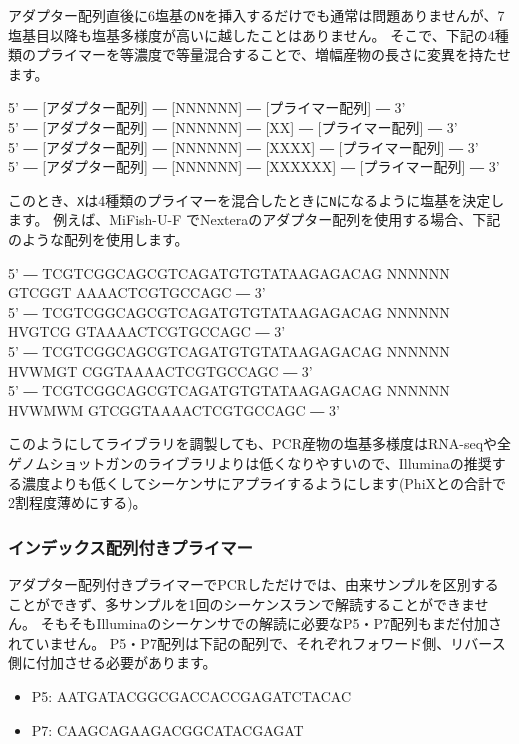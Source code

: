 \documentclass[titlepage,10pt,a4paper]{jsbook}
\newenvironment{pre}{\begin{leftbar}\raggedright\ttfamily\footnotesize\setlength{\baselineskip}{1.4em}}{\end{leftbar}\vspace{-1em}}
\begin{document}
アダプター配列直後に6塩基の\texttt{N}を挿入するだけでも通常は問題ありませんが、7塩基目以降も塩基多様度が高いに越したことはありません。
そこで、下記の4種類のプライマーを等濃度で等量混合することで、増幅産物の長さに変異を持たせます。

\begin{pre}
5' ― [アダプター配列] ― [NNNNNN] ― [プライマー配列] ― 3'\\
5' ― [アダプター配列] ― [NNNNNN] ― [XX] ― [プライマー配列] ― 3'\\
5' ― [アダプター配列] ― [NNNNNN] ― [XXXX] ― [プライマー配列] ― 3'\\
5' ― [アダプター配列] ― [NNNNNN] ― [XXXXXX] ― [プライマー配列] ― 3'
\end{pre}

このとき、\texttt{X}は4種類のプライマーを混合したときに\texttt{N}になるように塩基を決定します。
例えば、MiFish-U-F \citep{Miya2015}でNexteraのアダプター配列を使用する場合、下記のような配列を使用します。

\begin{pre}
5' ― TCGTCGGCAGCGTCAGATGTGTATAAGAGACAG NNNNNN GTCGGT AAAACTCGTGCCAGC ― 3'\\
5' ― TCGTCGGCAGCGTCAGATGTGTATAAGAGACAG NNNNNN HVGTCG GTAAAACTCGTGCCAGC ― 3'\\
5' ― TCGTCGGCAGCGTCAGATGTGTATAAGAGACAG NNNNNN HVWMGT CGGTAAAACTCGTGCCAGC ― 3'\\
5' ― TCGTCGGCAGCGTCAGATGTGTATAAGAGACAG NNNNNN HVWMWM GTCGGTAAAACTCGTGCCAGC ― 3'
\end{pre}

このようにしてライブラリを調製しても、PCR産物の塩基多様度はRNA-seqや全ゲノムショットガンのライブラリよりは低くなりやすいので、Illuminaの推奨する濃度よりも低くしてシーケンサにアプライするようにします(PhiXとの合計で2割程度薄めにする)。

\subsubsection{インデックス配列付きプライマー}

アダプター配列付きプライマーでPCRしただけでは、由来サンプルを区別することができず、多サンプルを1回のシーケンスランで解読することができません。
そもそもIlluminaのシーケンサでの解読に必要なP5・P7配列もまだ付加されていません。
P5・P7配列は下記の配列で、それぞれフォワード側、リバース側に付加させる必要があります。

\begin{itemize}
\item P5: AATGATACGGCGACCACCGAGATCTACAC
\item P7: CAAGCAGAAGACGGCATACGAGAT
\end{itemize}
\end{document}
